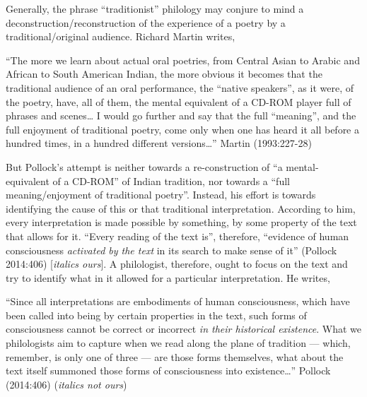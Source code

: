 Generally, the phrase “traditionist” philology may conjure to mind a deconstruction/reconstruction of the experience of a poetry by a traditional/original audience. Richard Martin writes,

\begin{myquote}
“The more we learn about actual oral poetries, from Central Asian to Arabic and African to South American Indian, the more obvious it becomes that the traditional audience of an oral performance, the “native speakers”, as it were, of the poetry, have, all of them, the mental equivalent of a CD-ROM player full of phrases and scenes… I would go further and say that the full “meaning”, and the full enjoyment of traditional poetry, come only when one has heard it all before a hundred times, in a hundred different versions…” 	
\hfill Martin (1993:227-28)
\end{myquote}

But Pollock’s attempt is neither towards a re-construction of “a mental-equivalent of a CD-ROM” of Indian tradition, nor towards a “full meaning/enjoyment of traditional poetry”. Instead, his effort is towards identifying the cause of this or that traditional interpretation. According to him, every interpretation is made possible by something, by some property of the text that allows for it. “Every reading of the text is”, therefore, “evidence of human consciousness {\sl activated by the text} in its search to make sense of it” (Pollock 2014:406) [{\sl italics ours}]. A philologist, therefore, ought to focus on the text and try to identify what in it allowed for a particular interpretation. He writes,

\begin{myquote}
“Since all interpretations are embodiments of human consciousness, which have been called into being by certain properties in the text, such forms of consciousness cannot be correct or incorrect {\sl in their historical existence}. What we philologists aim to capture when we read along the plane of tradition --- which, remember, is only one of three --- are those forms themselves, what about the text itself summoned those forms of consciousness into existence…”
\hfill Pollock (2014:406) ({\sl italics not ours})
\end{myquote}

